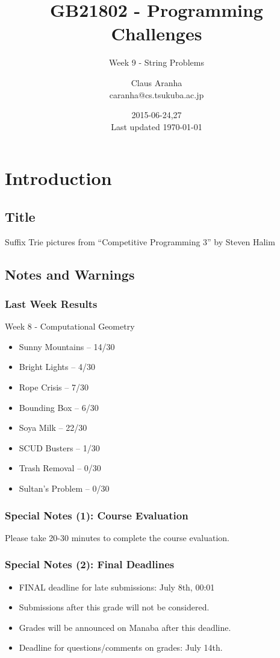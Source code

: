 \documentclass{beamer}
\title[GB21802]{GB21802 - Programming Challenges}
\subtitle[]{Week 9 - String Problems}
\author[Claus Aranha]{Claus Aranha\\{\footnotesize caranha@cs.tsukuba.ac.jp}}
\institute{College of Information Science}
\date{2015-06-24,27\\{\tiny Last updated \today}}
\begin{document}
\section{Introduction}
\subsection{Title}
\begin{frame}
\maketitle
\vfill

\hfill{\tiny Suffix Trie pictures from ``Competitive Programming 3'' by Steven Halim}
\end{frame}

\subsection{Notes and Warnings}

\begin{frame}
  \frametitle{Last Week Results}
  \begin{block}{Week 8 - Computational Geometry}
    \begin{itemize}
    \item Sunny Mountains -- 14/30
    \item Bright Lights -- 4/30
    \item Rope Crisis -- 7/30
    \item Bounding Box -- 6/30
    \item Soya Milk -- 22/30
    \item SCUD Busters -- 1/30
    \item Trash Removal -- 0/30
    \item Sultan's Problem -- 0/30
    \end{itemize}
  \end{block}
\end{frame}

\begin{frame}
  \frametitle{Special Notes (1): Course Evaluation} 

  Please take 20-30 minutes to complete the course evaluation. 

\end{frame}

\begin{frame}
  \frametitle{Special Notes (2): Final Deadlines}

  \begin{itemize}
  \item FINAL deadline for late submissions: \alert{July 8th, 00:01}
  \item Submissions after this grade will not be considered.
  \item Grades will be announced on Manaba after this deadline.
  \item Deadline for questions/comments on grades: July 14th.
  \end{itemize}
\end{frame}
\end{document}
